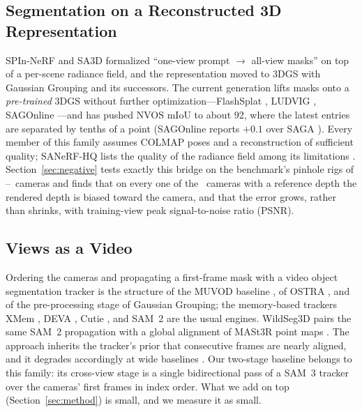 \documentclass[journal]{IEEEtran}
\begin{document}
\subsection{Segmentation on a Reconstructed 3D Representation}
SPIn-NeRF \cite{spinnerf} and SA3D \cite{sa3d} formalized ``one-view prompt
$\rightarrow$ all-view masks'' on top of a per-scene radiance field, and the
representation moved to 3DGS with Gaussian Grouping \cite{gaussiangrouping} and
its successors. The current generation lifts masks onto a \emph{pre-trained}
3DGS without further optimization---FlashSplat \cite{flashsplat}, LUDVIG
\cite{ludvig}, SAGOnline \cite{sagonline}---and has pushed NVOS mIoU to
about 92, where the latest entries are separated by tenths of a point
(SAGOnline reports $+0.1$ over SAGA \cite{sagonline}). Every member of this
family assumes COLMAP poses \cite{colmap} and a reconstruction of sufficient
quality; SANeRF-HQ lists the quality of the radiance field among its
limitations \cite{sanerfhq}. Section~\ref{sec:negative} tests exactly this bridge on the benchmark's pinhole
rigs of \gsViewsMin--\gsViewsMax\ cameras and finds that on every one of the
\gsCams\ cameras with a reference depth the rendered depth is biased toward
the camera, and that the error grows, rather than shrinks, with training-view peak
signal-to-noise ratio (PSNR).

\subsection{Views as a Video}
Ordering the cameras and propagating a first-frame mask with a video object
segmentation tracker is the structure of the MUVOD baseline \cite{muvod}, of
OSTRA \cite{ostra}, and of the pre-processing stage of Gaussian Grouping; the
memory-based trackers XMem \cite{xmem}, DEVA \cite{deva}, Cutie \cite{cutie},
and SAM~2 \cite{sam2} are the usual engines. WildSeg3D \cite{wildseg3d} pairs
the same SAM~2 propagation with a global alignment of MASt3R point maps
\cite{mast3r}. The approach inherits the
tracker's prior that consecutive frames are nearly aligned, and it degrades
accordingly at wide baselines \cite{segmast3r}. Our two-stage baseline belongs
to this family: its cross-view stage is a single
bidirectional pass of a SAM~3 tracker over the cameras' first frames in index
order. What we add on top (Section~\ref{sec:method}) is small, and we measure it
as small.
\end{document}

